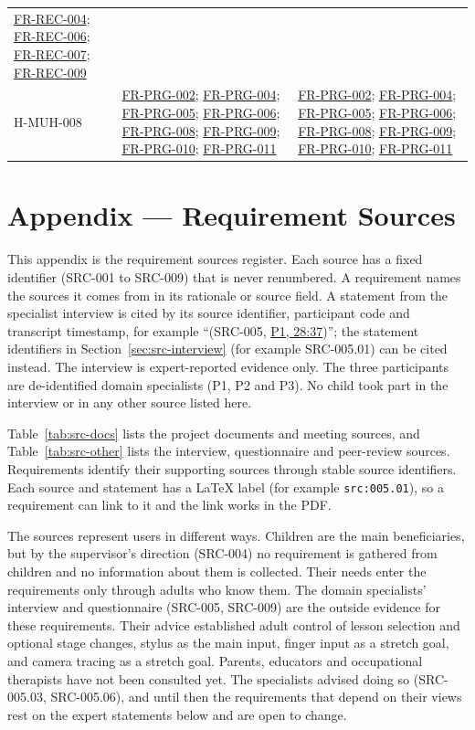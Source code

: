 \documentclass[12pt]{article}
\renewcommand{\_}{\textunderscore\allowbreak}%
\newcommand{\intlink}[3]{\hyperref[int:#1-#2]{#3}}
\newcommand{\intref}[2]{\intlink{#1}{#2}{#1, #2}}
\newcommand{\reqref}[1]{\hyperref[req:#1]{#1}}
\begin{document}
{\begin{longtable}{@{}>{\raggedright\arraybackslash}p{}
>{\raggedright\arraybackslash}p{}
>{\raggedright\arraybackslash}p{}@{}}
\reqref{FR-REC-004}; \reqref{FR-REC-006}; \reqref{FR-REC-007};
\reqref{FR-REC-009} \\
\addlinespace
H-MUH-008 & \reqref{FR-PRG-002}; \reqref{FR-PRG-004}; \reqref{FR-PRG-005};
\reqref{FR-PRG-006}; \reqref{FR-PRG-008}; \reqref{FR-PRG-009};
\reqref{FR-PRG-010}; \reqref{FR-PRG-011} & \reqref{FR-PRG-002};
\reqref{FR-PRG-004}; \reqref{FR-PRG-005}; \reqref{FR-PRG-006};
\reqref{FR-PRG-008}; \reqref{FR-PRG-009}; \reqref{FR-PRG-010};
\reqref{FR-PRG-011} \\
\end{longtable}}


\clearpage



\newpage{}
\section{Appendix --- Requirement Sources}
\label{app:sources}

This appendix is the requirement sources register. Each source has a fixed
identifier (SRC-001 to SRC-009) that is never renumbered. A requirement names
the sources it comes from in its rationale or source field. A statement from the
specialist interview is cited by its source identifier, participant code and
transcript timestamp, for example ``(SRC-005, \intref{P1}{28:37})''; the
statement identifiers in Section~\ref{sec:src-interview} (for example
SRC-005.01) can be cited instead. The interview is expert-reported evidence
only. The three participants are de-identified domain specialists (P1, P2 and
P3). No child took part in the interview or in any other source listed here.

Table~\ref{tab:src-docs} lists the project documents and meeting sources, and
Table~\ref{tab:src-other} lists the interview, questionnaire and peer-review
sources. Requirements identify their supporting sources through stable source
identifiers. Each source and statement has a \LaTeX{} label (for example
\texttt{src:005.01}), so a requirement can link to it and the link works in the
PDF.

The sources represent users in different ways. Children are the main
beneficiaries, but by the supervisor's direction (SRC-004) no requirement is
gathered from children and no information about them is collected. Their needs
enter the requirements only through adults who know them. The domain
specialists' interview and questionnaire (SRC-005, SRC-009) are the outside
evidence for these requirements. Their advice established adult control of
lesson selection and optional stage changes, stylus as the main input, finger
input as a stretch goal, and camera tracing as a stretch goal. Parents,
educators and occupational therapists have not been consulted yet. The
specialists advised doing so (SRC-005.03, SRC-005.06), and until then the
requirements that depend on their views rest on the expert statements below and
are open to change.
\end{document}
